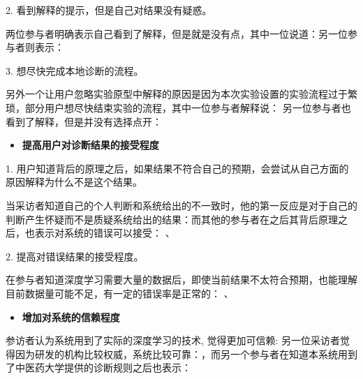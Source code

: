2. 看到解释的提示，但是自己对结果没有疑惑。

两位参与者明确表示自己看到了解释，但是就是没有点，其中一位说道：另一位参与者则表示：


3. 想尽快完成本地诊断的流程。

另外一个让用户忽略实验原型中解释的原因是因为本次实验设置的实验流程过于繁琐，部分用户想尽快结束实验的流程，其中一位参与者解释说：
另一位参与者也看到了解释，但是并没有选择点开：

\begin{itemize}
    \item \textbf{提高用户对诊断结果的接受程度}
\end{itemize}

1. 用户知道背后的原理之后，如果结果不符合自己的预期，会尝试从自己方面的原因解释为什么不是这个结果。

当采访者知道自己的个人判断和系统给出的不一致时，他的第一反应是对于自己的判断产生怀疑而不是质疑系统给出的结果：而其他的参与者在之后其背后原理之后，也表示对系统的错误可以接受：
、


2. 提高对错误结果的接受程度。

在参与者知道深度学习需要大量的数据后，即使当前结果不太符合预期，也能理解目前数据量可能不足，有一定的错误率是正常的：
、

\begin{itemize}
    \item \textbf{增加对系统的信赖程度}
\end{itemize}

参访者认为系统用到了实际的深度学习的技术, 觉得更加可信赖:
另一位采访者觉得因为研发的机构比较权威，系统比较可靠：，而另一个参与者在知道本系统用到了中医药大学提供的诊断规则之后也表示：

